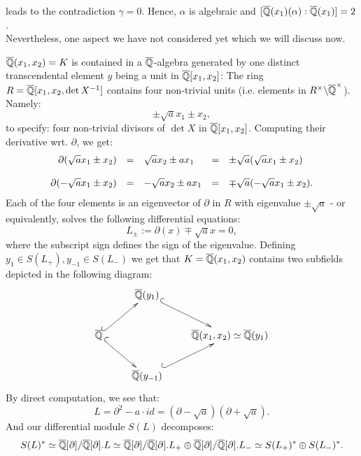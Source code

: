 leads to the contradiction $\gamma = 0$. Hence, $\alpha$ is algebraic and $[\currfieldx(\alpha) : \currfieldx] = 2$.\\
\indent Nevertheless, one aspect we have not considered yet which we will discuss now.
\item $\currfield(x_1,x_2) = K$ is contained in a $\currfield$-algebra generated by one distinct transcendental element $y$ being a unit in $\currfield[x_1,x_2]$: The ring $R = \currfield[x_1,x_2,\det X^{-1}]$ contains four non-trivial units (i.e. elements in $R^\times \bsl \currfield^\times$). Namely:
$$\pm \sqrt{a} x_1 \pm x_2,$$
to specify: four non-trivial divisors of $\det X$ in $\currfield[x_1,x_2]$. Computing their derivative wrt. $\partial$, we get:
$$\bao{rclcl}
\partial(\sqrt{a} x_1 \pm x_2) &=& \sqrt{a} x_2 \pm a x_1 &=& \pm \sqrt{a} (\sqrt{a} x_1 \pm x_2)\\
&&&&\\
\partial(-\sqrt{a} x_1 \pm x_2) &=& -\sqrt{a} x_2 \pm a x_1 &=& \mp\sqrt{a} (-\sqrt{a} x_1 \pm x_2).\\
\ea$$
Each of the four elements is an eigenvector of $\partial$ in $R$ with eigenvalue $\pm \sqrt{a}$ - or equivalently, solves the following differential equations:
$$L_{\pm} := \partial(x) \mp \sqrt{a} x = 0,$$
where the subscript sign defines the sign of the eigenvalue. Defining $y_1 \in S(L_+), y_{-1} \in S(L_-)$ we get that $K = \currfield(x_1,x_2)$ contains two subfields depicted in the following diagram:
$$\xymatrix{
& \currfield(y_1) \ar@{^{(}->}[rd]&\\
\currfield\ar@{^{(}->}[rd]\ar@{^{(}->}[ru]&&\currfield(x_1,x_2) \simeq \currfield(y_1)\\
& \currfield(y_{-1}) \ar@{^{(}->}[ru]&\\
}$$
By direct computation, we see that:
$$L = \partial^2 - a \cdot id = (\partial - \sqrt{a}) (\partial + \sqrt{a}).$$
And our differential module $S(L)$ decomposes:
$$S(L)^* \simeq \currfield[\partial]/\currfield[\partial].L \simeq \currfield[\partial]/\currfield[\partial].L_+ \oplus \currfield[\partial]/\currfield[\partial].L_- \simeq S(L_+)^* \oplus S(L_-)^*.$$
\en
